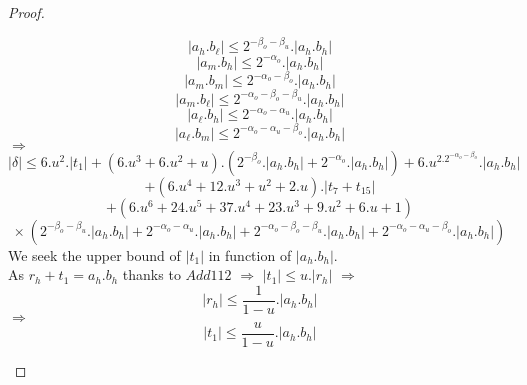 \begin{proof}
\begin{itemize}
$$\lvert a_h.b_{\ell} \rvert \le 2^{-\beta_o -\beta_u}. \lvert a_h.b_h \rvert $$
$$\lvert a_m.b_h \rvert \le 2^{-\alpha_o}. \lvert a_h.b_h \rvert $$
$$\lvert a_m.b_m \rvert \le 2^{-\alpha_o -\beta_o}. \lvert a_h.b_h \rvert $$
$$\lvert a_m.b_{\ell} \rvert \le 2^{-\alpha_o -\beta_o -\beta_u}. \lvert a_h.b_h \rvert $$
$$\lvert a_{\ell}.b_h \rvert \le 2^{-\alpha_o - \alpha_u}. \lvert a_h.b_h \rvert $$
$$\lvert a_{\ell}.b_m \rvert \le 2^{-\alpha_o - \alpha_u -\beta_o}. \lvert a_h.b_h \rvert $$
$\Rightarrow$
$$ \lvert \delta  \rvert \le 6.u^2.\lvert t_1 \rvert + (6.u^3+6.u^2+u).(2^{-\beta_o}. \lvert a_h.b_h \rvert + 2^{-\alpha_o}. \lvert a_h.b_h \rvert) +  6.u^2.2^{-\alpha_o -\beta_o}. \lvert a_h.b_h \rvert $$
$$+ (6.u^4+12.u^3+u^2+2.u).\lvert t_7 + t_{15} \rvert$$
$$+ (6.u^6+24.u^5+37.u^4+23.u^3+9.u^2+6.u+1)$$
$$ \times \  (2^{-\beta_o -\beta_u}. \lvert a_h.b_h \rvert + 2^{-\alpha_o - \alpha_u}. \lvert a_h.b_h \rvert + 2^{-\alpha_o -\beta_o -\beta_u}. \lvert a_h.b_h \rvert + 2^{-\alpha_o - \alpha_u -\beta_o}. \lvert a_h.b_h \rvert)  $$
We seek the upper bound of $\lvert t_1 \rvert $ in function of $\lvert a_h.b_h \rvert $.\\
As $r_h +t_1 = a_h.b_h$ thanks to $Add112$ $\Rightarrow$ $\lvert t_1 \rvert \le u. \lvert r_h \rvert$ $\Rightarrow$
$$ \lvert r_h \rvert \le \frac{1}{1-u} .\lvert a_h.b_h \rvert $$ 
$\Rightarrow$
$$ \lvert t_1 \rvert \le \frac{u}{1-u} .\lvert a_h.b_h \rvert $$


\end{itemize}
\end{proof}
